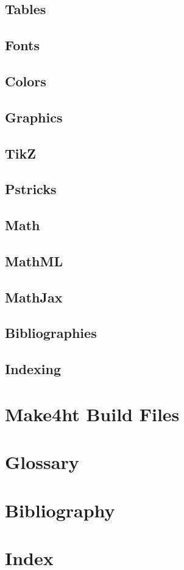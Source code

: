 \documentclass{book}
\begin{document}
\section{Tables}

\section{Fonts}
\section{Colors}

\section{Graphics}
\section{TikZ }
\section{Pstricks}

\section{Math}
\section{MathML}
\section{MathJax}

\section{Bibliographies}
\section{Indexing}

\chapter{Make4ht Build Files}

\chapter{Glossary}
\chapter{Bibliography}
\chapter{Index}
\end{document}
